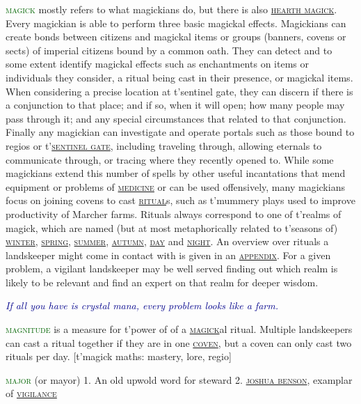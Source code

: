 \documentclass[twoside,11pt,b5paper,twocolumn]{scrbook}
\newcommand{\estcab}[1]{\textsc{\textcolor{marron}{#1}}}
\renewcommand{\paragraph}[1]{\par\noindent\markboth{#1}{#1}\estcab{\textcolor{darkgreen}{#1}}\label{#1} }
\newcommand{\see}[1]{{\estcab{\hyperref[#1]{#1}}}}
\newcommand{\proverb}[1]{\par \textcolor{darkblue}{\itshape #1}}
\begin{document}
\paragraph{magick} mostly refers to what magickians do, but there is also \see{hearth magick}. Every magickian is able to perform three basic magickal effects. Magickians can create bonds between citizens and magickal items or groups (banners, covens or sects) of imperial citizens bound by a common oath. They can detect and to some extent identify magickal effects such as enchantments on items or individuals they consider, a ritual being cast in their presence, or magickal items. When considering a precise location at t'sentinel gate, they can discern if there is a conjunction to that place; and if so, when it will open; how many people may pass through it; and any special circumstances that related to that conjunction. Finally any magickian can investigate and operate portals such as those bound to regios or t'\see{sentinel gate}, including traveling through, allowing eternals to communicate through, or tracing where they recently opened to. While some magickians extend this number of spells by other useful incantations that mend equipment or problems of \see{medicine} or can be used offensively, many magickians focus on joining covens to cast \see{ritual}s, such as t'mummery plays used to improve productivity of Marcher farms. Rituals always correspond to one of t'realms of magick, which are named (but at most metaphorically related to t'seasons of) \see{winter}, \see{spring}, \see{summer}, \see{autumn}, \see{day} and \see{night}. An overview over rituals a landskeeper might come in contact with is given in an \see{appendix}. For a given problem, a vigilant landskeeper may be well served finding out which realm is likely to be relevant and find an expert on that realm for deeper wisdom. \proverb{If all you have is crystal mana, every problem looks like a farm.}
\paragraph{magnitude} is a measure for t'power of of a \see{magick}al ritual. Multiple landskeepers can cast a ritual together if they are in one \see{coven}, but a coven can only cast two rituals per day. [t'magick maths: mastery, lore, regio]
\paragraph{major} (or mayor) 1. An old upwold word for steward 2. \see{joshua benson}, examplar of \see{vigilance}
\end{document}
